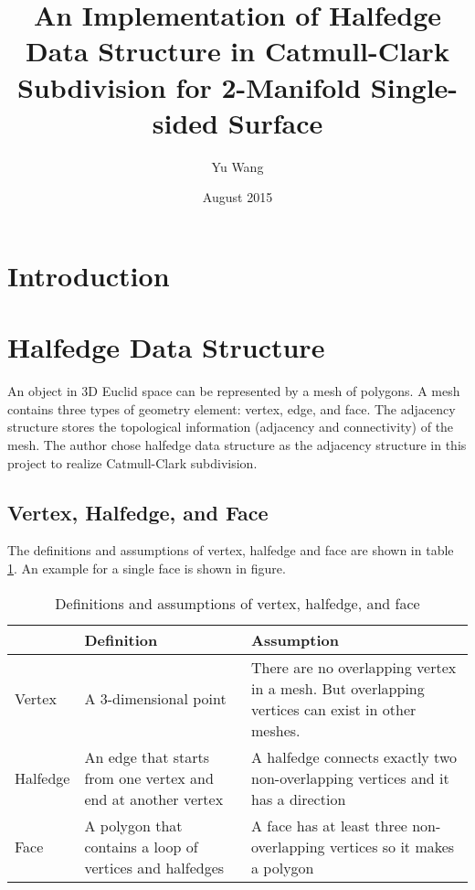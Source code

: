\documentclass[12pt]{article}
\title{An Implementation of Halfedge Data Structure in Catmull-Clark Subdivision for 2-Manifold Single-sided Surface}
\author{Yu Wang}
\date{August 2015}
\begin{document}
\maketitle
\newpage


\section{Introduction}

\section{Halfedge Data Structure} \label{sec:halfedge}

An object in 3D Euclid space can be represented by a mesh of polygons. A mesh contains three types of geometry element: vertex, edge, and face. The adjacency structure stores the topological information (adjacency and connectivity) of the mesh. The author chose halfedge data structure as the adjacency structure in this project to realize Catmull-Clark subdivision.

\subsection{Vertex, Halfedge, and Face}

The definitions and assumptions of vertex, halfedge and face are shown in table \ref{table:vhfdef}. An example for a single face is shown in figure.
\begin{table}[h]
\centering
\begin{tabular}{| l | p{} | p{}|}
\hline
		&	Definition	& Assumption	\\
\hline
Vertex	&	A 3-dimensional point		&	There are no overlapping vertex in a mesh. But overlapping vertices can exist in other meshes.		\\
\hline
Halfedge	&	An edge that starts from one vertex and end at another vertex & A halfedge connects exactly two non-overlapping vertices and it has a direction\\
\hline
Face		&	A polygon that contains a loop of vertices and halfedges	& A face has at least three non-overlapping vertices so it makes a polygon\\
\hline
\end{tabular}
\caption{Definitions and assumptions of vertex, halfedge, and face} 
\label{table:vhfdef}
\end{table}
\end{document}
